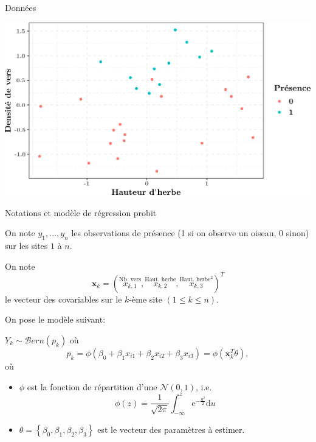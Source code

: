 \documentclass[9pt,ignorenonframetext,]{beamer}
\providecommand{\tightlist}{%
  \setlength{\itemsep}{0pt}\setlength{\parskip}{0pt}}
\begin{document}
\begin{frame}{Données}
\protect\hypertarget{donnuxe9es}{}

\includegraphics{diapos_inference_bayesienne_files/figure-beamer/plot_donnees_presence-1.pdf}

\end{frame}

\begin{frame}{Notations et modèle de régression probit}
\protect\hypertarget{notations-et-moduxe8le-de-ruxe9gression-probit}{}

On note \(y_1, \dots, y_n\) les observations de présence (1 si on
observe un oiseau, 0 sinon) sur les sites \(1\) à \(n\).

On note
\[\mathbf{x}_k = (\overset{\text{Nb. vers}}{x_{k,1}}, \overset{\text{Haut. herbe}}{x_{k,2}}, \overset{\text{Haut. herbe}^2}{x_{k,3}})^T\]
le vecteur des covariables sur le \(k\)-ème site
\((1\leq k \leq n)\).\pause

On pose le modèle suivant:

\(Y_k \sim \mathcal{B}ern(p_k)\) où
\[p_k = \phi(\beta_0 + \beta_1 x_{i1} + \beta_2x_{i2} + \beta_3 x_{i3}) = \phi(\mathbf{x}_k^T\theta),\]
où

\begin{itemize}
\tightlist
\item
  \(\phi\) est la fonction de répartition d'une \(\mathcal{N}(0, 1)\),
  i.e.
  \[\phi(z) = \frac{1}{\sqrt{2\pi}}\int_{-\infty}^z \text{e}^{-\frac{u^2}{2}}\text{d}u\]
\item
  \(\theta = \left\lbrace \beta_0, \beta_1, \beta_2, \beta_3\right\rbrace\)
  est le vecteur des paramètres à estimer.
\end{itemize}

\end{frame}
\end{document}
